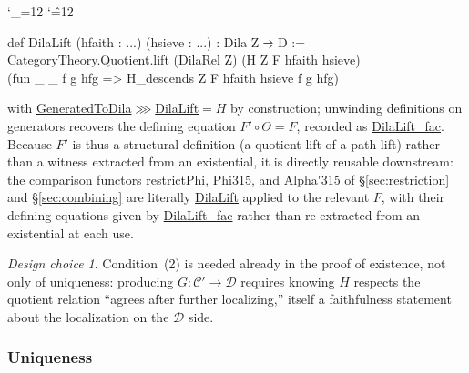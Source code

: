 \documentclass[11pt]{amsart}
\newcommand{\lc}[1]{\url{#1}}
\newenvironment{leancode}{%
  \begingroup
  \catcode`\_=12\relax
  \catcode`\^=12\relax
  \small\ttfamily\raggedright\baselineskip=1.15\baselineskip
  \par\smallskip\noindent
}{%
  \par\smallskip
  \endgroup
}
\theoremstyle{plain}
\theoremstyle{definition}
\theoremstyle{remark}
\newtheorem*{designchoice}{Design choice}
\newcommand{\calC}{\mathcal C}
\newcommand{\calD}{\mathcal D}
\begin{document}
\begin{leancode}
def DilaLift (hfaith : ...) (hsieve : ...) : Dila Z ⥤ D := \\
  CategoryTheory.Quotient.lift (DilaRel Z) (H Z F hfaith hsieve) \\
    (fun _ _ f g hfg => H_descends Z F hfaith hsieve f g hfg) \\
\end{leancode}
with \lc{GeneratedToDila}$ \ggg $\lc{DilaLift}$ = H$ by construction; unwinding definitions
on generators recovers the defining equation $F' \circ \Theta = F$, recorded as
\lc{DilaLift_fac}. Because $F'$ is thus a structural definition (a quotient-lift of a
path-lift) rather than a witness extracted from an existential, it is directly reusable
downstream: the comparison functors \lc{restrictPhi}, \lc{Phi315}, and \lc{Alpha'315} of
\S\ref{sec:restriction} and \S\ref{sec:combining} are literally \lc{DilaLift} applied to the
relevant $F$, with their defining equations given by \lc{DilaLift_fac} rather than
re-extracted from an existential at each use.

\begin{designchoice}
Condition~(2) is needed already in the proof of existence, not only of uniqueness:
producing $G:\calC'\to\calD$ requires knowing $H$ respects the quotient relation ``agrees
after further localizing,'' itself a faithfulness statement about the localization on the
$\calD$ side.
\end{designchoice}

\subsubsection{Uniqueness}
\end{document}
